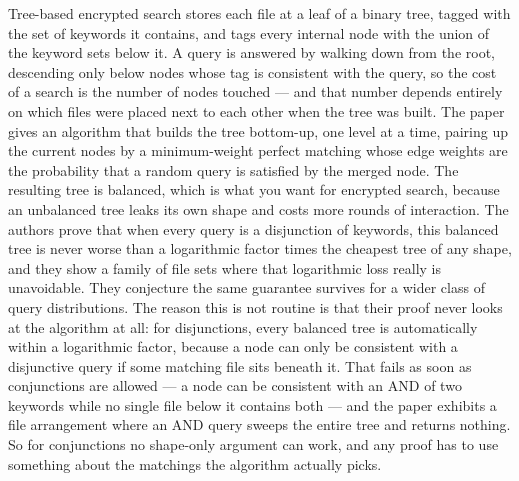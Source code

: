 \documentclass{aicr-conjecture}
\begin{document}

\vspace{0.4em}

\begin{informalconjecture}
Tree-based encrypted search stores each file at a leaf of a binary tree,
tagged with the set of keywords it contains, and tags every internal node
with the union of the keyword sets below it. A query is answered by walking
down from the root, descending only below nodes whose tag is consistent
with the query, so the cost of a search is the number of nodes touched ---
and that number depends entirely on which files were placed next to each
other when the tree was built. The paper gives an algorithm that builds the
tree bottom-up, one level at a time, pairing up the current nodes by a
minimum-weight perfect matching whose edge weights are the probability that
a random query is satisfied by the merged node. The resulting tree is
balanced, which is what you want for encrypted search, because an
unbalanced tree leaks its own shape and costs more rounds of interaction.
The authors prove that when every query is a disjunction of keywords, this
balanced tree is never worse than a logarithmic factor times the cheapest
tree of any shape, and they show a family of file sets where that
logarithmic loss really is unavoidable. They conjecture the same guarantee
survives for a wider class of query distributions. The reason this is not
routine is that their proof never looks at the algorithm at all: for
disjunctions, every balanced tree is automatically within a logarithmic
factor, because a node can only be consistent with a disjunctive query if
some matching file sits beneath it. That fails as soon as conjunctions are
allowed --- a node can be consistent with an AND of two keywords while no
single file below it contains both --- and the paper exhibits a file
arrangement where an AND query sweeps the entire tree and returns nothing.
So for conjunctions no shape-only argument can work, and any proof has to
use something about the matchings the algorithm actually picks.
\end{informalconjecture}
\end{document}
